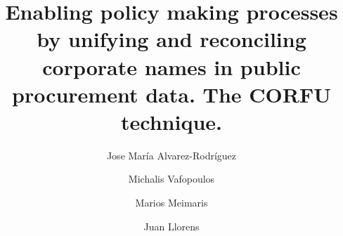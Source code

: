 \documentclass[1p,12pt]{elsarticle}
\begin{document}
\begin{frontmatter}





\title{Enabling policy making processes by unifying and reconciling corporate names in public procurement data. The CORFU technique.}

\author[uc3m]{Jose María Alvarez-Rodríguez}
\address[uc3m]{Carlos III University of Madrid\\ Department of Computer Science \\ Avd. de la Universidad, 30, Leganés \\ Madrid, Spain}


\author[ntu]{Michalis Vafopoulos}
\address[ntu]{National Technical University of Athens\\ 9 Heroon Polytechneiou st. 15773, Zografou Campus, \\ Athens, Greece}


\author[ntu]{Marios Meimaris}

\author[uc3m]{Juan Llorens}






\end{frontmatter}
\end{document}
